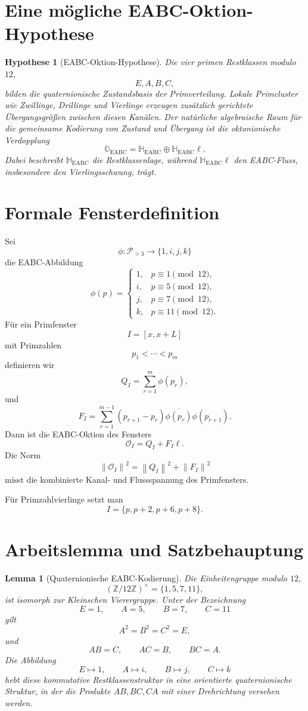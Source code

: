 \documentclass[11pt,a4paper]{article}
\theoremstyle{definition}
\theoremstyle{plain}
\newtheorem{lemma}[definition]{Lemma}
\newtheorem{hypothese}[definition]{Hypothese}
\newcommand{\Z}{\mathbb{Z}}
\newcommand{\HH}{\mathbb{H}}
\newcommand{\OO}{\mathbb{O}}
\newcommand{\PP}{\mathcal{P}}
\newcommand{\EABC}{\mathrm{EABC}}
\newcommand{\norm}[1]{\left\lVert #1 \right\rVert}
\newcommand{\conj}[1]{\overline{#1}}
\begin{document}
	\section{Eine mögliche EABC-Oktion-Hypothese}
	
	\begin{hypothese}[EABC-Oktion-Hypothese]
		Die vier primen Restklassen modulo $12$,
		\[
		E,A,B,C,
		\]
		bilden die quaternionische Zustandsbasis der Primverteilung. Lokale Primcluster wie Zwillinge, Drillinge und Vierlinge erzeugen zusätzlich gerichtete Übergangsgrößen zwischen diesen Kanälen. Der natürliche algebraische Raum für die gemeinsame Kodierung von Zustand und Übergang ist die oktonionische Verdopplung
		\[
		\OO_{\EABC}
		=
		\HH_{\EABC}\oplus \HH_{\EABC}\ell.
		\]
		Dabei beschreibt $\HH_{\EABC}$ die Restklassenlage, während $\HH_{\EABC}\ell$ den EABC-Fluss, insbesondere den Vierlingsschwung, trägt.
	\end{hypothese}
	
	\section{Formale Fensterdefinition}
	
	Sei
	\[
	\phi:\PP_{>3}\to\{1,i,j,k\}
	\]
	die EABC-Abbildung
	\[
	\phi(p)=
	\begin{cases}
		1, & p\equiv 1\pmod{12},\\
		i, & p\equiv 5\pmod{12},\\
		j, & p\equiv 7\pmod{12},\\
		k, & p\equiv 11\pmod{12}.
	\end{cases}
	\]
	Für ein Primfenster
	\[
	I=[x,x+L]
	\]
	mit Primzahlen
	\[
	p_1<\cdots<p_m
	\]
	definieren wir
	\[
	Q_I=\sum_{r=1}^m\phi(p_r),
	\]
	und
	\[
	F_I=\sum_{r=1}^{m-1}(p_{r+1}-p_r)\conj{\phi(p_r)}\phi(p_{r+1}).
	\]
	Dann ist die EABC-Oktion des Fensters
	\[
	\boxed{
		\mathcal O_I=Q_I+F_I\ell
	}.
	\]
	Die Norm
	\[
	\norm{\mathcal O_I}^2=\norm{Q_I}^2+\norm{F_I}^2
	\]
	misst die kombinierte Kanal- und Flussspannung des Primfensters.
	
	Für Primzahlvierlinge setzt man
	\[
	I=\{p,p+2,p+6,p+8\}.
	\]
	
	\section{Arbeitslemma und Satzbehauptung}
	
	\begin{lemma}[Quaternionische EABC-Kodierung]
		Die Einheitengruppe modulo $12$,
		\[
		(\Z/12\Z)^\times=\{1,5,7,11\},
		\]
		ist isomorph zur Kleinschen Vierergruppe. Unter der Bezeichnung
		\[
		E=1,
		\qquad
		A=5,
		\qquad
		B=7,
		\qquad
		C=11
		\]
		gilt
		\[
		A^2=B^2=C^2=E,
		\]
		und
		\[
		AB=C,
		\qquad
		AC=B,
		\qquad
		BC=A.
		\]
		Die Abbildung
		\[
		E\mapsto 1,
		\qquad
		A\mapsto i,
		\qquad
		B\mapsto j,
		\qquad
		C\mapsto k
		\]
		hebt diese kommutative Restklassenstruktur in eine orientierte quaternionische Struktur, in der die Produkte $AB,BC,CA$ mit einer Drehrichtung versehen werden.
	\end{lemma}
	
\end{document}
